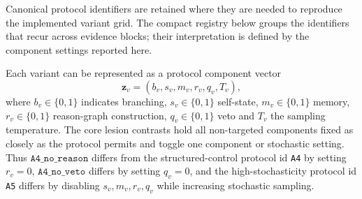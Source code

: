 ﻿\documentclass[preprint,12pt,authoryear]{elsarticle}
\begin{document}
Canonical protocol identifiers are retained where they are needed to reproduce the implemented variant grid. The compact registry below groups the identifiers that recur across evidence blocks; their interpretation is defined by the component settings reported here.
\begin{center}
\scriptsize
{}
\end{center}

Each variant can be represented as a protocol component vector
\begin{equation}
\mathbf{z}_v=(b_v,s_v,m_v,r_v,q_v,T_v),
\end{equation}
where \(b_v\in\{0,1\}\) indicates branching, \(s_v\in\{0,1\}\) self-state, \(m_v\in\{0,1\}\) memory, \(r_v\in\{0,1\}\) reason-graph construction, \(q_v\in\{0,1\}\) veto and \(T_v\) the sampling temperature. The core lesion contrasts hold all non-targeted components fixed as closely as the protocol permits and toggle one component or stochastic setting. Thus \(\texttt{A4\_no\_reason}\) differs from the structured-control protocol id \texttt{A4} by setting \(r_v=0\), \(\texttt{A4\_no\_veto}\) differs by setting \(q_v=0\), and the high-stochasticity protocol id \texttt{A5} differs by disabling \(s_v,m_v,r_v,q_v\) while increasing stochastic sampling.
\end{document}
